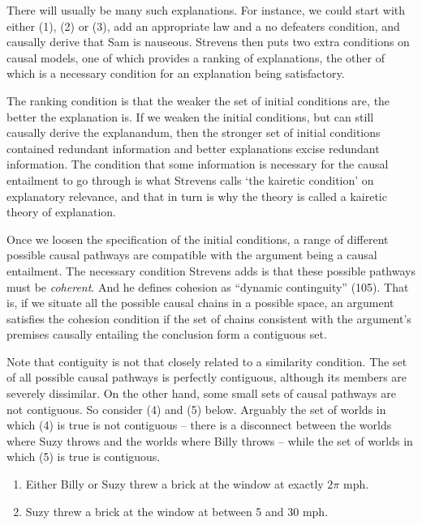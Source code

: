 There will usually be many such explanations. For instance, we could start with either (1), (2) or (3), add an appropriate law and a no defeaters condition, and causally derive that Sam is nauseous. Strevens then puts two extra conditions on causal models, one of which provides a ranking of explanations, the other of which is a necessary condition for an explanation being satisfactory. 

The ranking condition is that the weaker the set of initial conditions are, the better the explanation is. If we weaken the initial conditions, but can still causally derive the explanandum, then the stronger set of initial conditions contained redundant information and better explanations excise redundant information. The condition that some information is necessary for the causal entailment to go through is what Strevens calls `the kairetic condition' on explanatory relevance, and that in turn is why the theory is called a kairetic theory of explanation.

Once we loosen the specification of the initial conditions, a range of different possible causal pathways are compatible with the argument being a causal entailment. The necessary condition Strevens adds is that these possible pathways must be \textit{coherent}. And he defines cohesion as ``dynamic continguity'' (105). That is, if we situate all the possible causal chains in a possible space, an argument satisfies the cohesion condition if the set of chains consistent with the argument's premises causally entailing the conclusion form a contiguous set.

Note that contiguity is not that closely related to a similarity condition. The set of all possible causal pathways is perfectly contiguous, although its members are severely dissimilar. On the other hand, some small sets of causal pathways are not contiguous. So consider (4) and (5) below. Arguably the set of worlds in which (4) is true is not contiguous -- there is a disconnect between the worlds where Suzy throws and the worlds where Billy throws -- while the set of worlds in which (5) is true is contiguous. 

\begin{enumerate}
\renewcommand{\labelenumi}{(\arabic{enumi})}
\setcounter{enumi}{3}
\item Either Billy or Suzy threw a brick at the window at exactly $2\pi$ mph.
\item Suzy threw a brick at the window at between 5 and 30 mph.
\end{enumerate}

